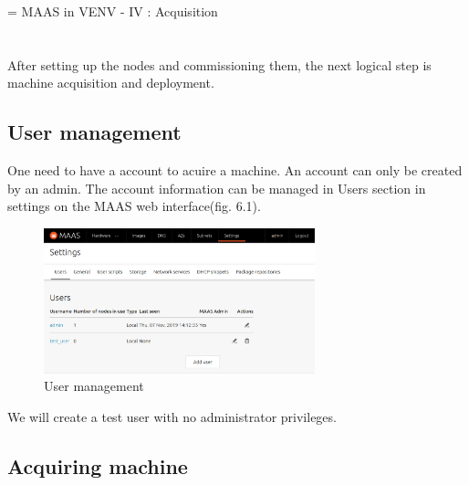 \chapname = {MAAS in VENV - IV : Acquisition}

\chapter{\the\chapname}

After setting up the nodes and commissioning them, the next logical step is machine acquisition and deployment.

\section{User management}

One need to have a account to acuire a machine. An account can only be created by an admin. The account information can be managed in Users section in settings on the MAAS web interface(fig. 6.1).

\begin{figure}[!ht]
    \centering
    \includegraphics[width=0.7\textwidth]{images/6-1.png}
    \caption{User management}
\end{figure}

We will create a test user with no administrator privileges. 

\section{Acquiring machine}